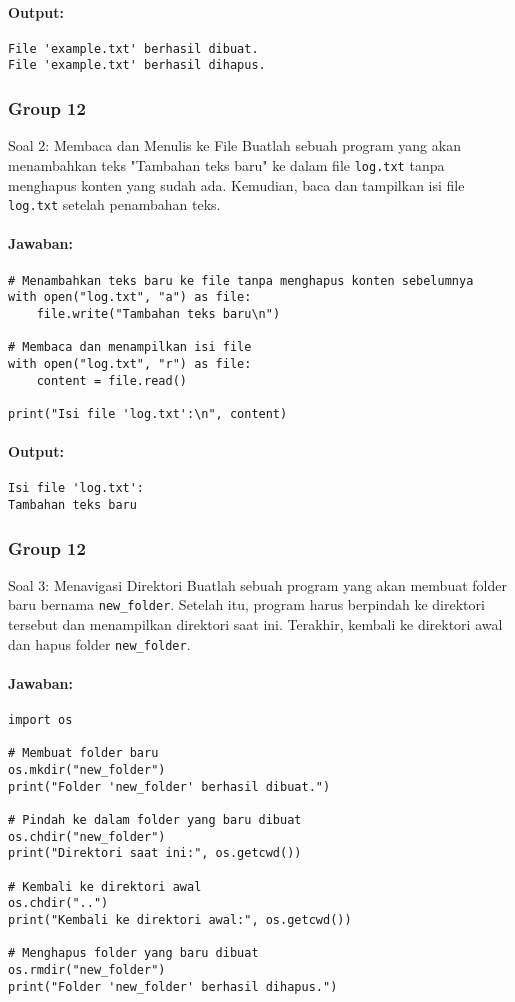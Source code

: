 \documentclass[12pt]{article}
\begin{document}
\paragraph{Output:}
\begin{verbatim}
File 'example.txt' berhasil dibuat.
File 'example.txt' berhasil dihapus.
\end{verbatim}

\subsubsection{Group 12}
{Soal 2: Membaca dan Menulis ke File}
Buatlah sebuah program yang akan menambahkan teks "Tambahan teks baru" ke dalam file \texttt{log.txt} tanpa menghapus konten yang sudah ada. Kemudian, baca dan tampilkan isi file \texttt{log.txt} setelah penambahan teks.

\paragraph{Jawaban:}
\begin{verbatim}
# Menambahkan teks baru ke file tanpa menghapus konten sebelumnya
with open("log.txt", "a") as file:
    file.write("Tambahan teks baru\n")

# Membaca dan menampilkan isi file
with open("log.txt", "r") as file:
    content = file.read()

print("Isi file 'log.txt':\n", content)
\end{verbatim}

\paragraph{Output:}
\begin{verbatim}
Isi file 'log.txt':
Tambahan teks baru
\end{verbatim}

\subsubsection{Group 12}
{Soal 3: Menavigasi Direktori}
Buatlah sebuah program yang akan membuat folder baru bernama \texttt{new\_folder}. Setelah itu, program harus berpindah ke direktori tersebut dan menampilkan direktori saat ini. Terakhir, kembali ke direktori awal dan hapus folder \texttt{new\_folder}.

\paragraph{Jawaban:}
\begin{verbatim}
import os

# Membuat folder baru
os.mkdir("new_folder")
print("Folder 'new_folder' berhasil dibuat.")

# Pindah ke dalam folder yang baru dibuat
os.chdir("new_folder")
print("Direktori saat ini:", os.getcwd())

# Kembali ke direktori awal
os.chdir("..")
print("Kembali ke direktori awal:", os.getcwd())

# Menghapus folder yang baru dibuat
os.rmdir("new_folder")
print("Folder 'new_folder' berhasil dihapus.")
\end{verbatim}
\end{document}
